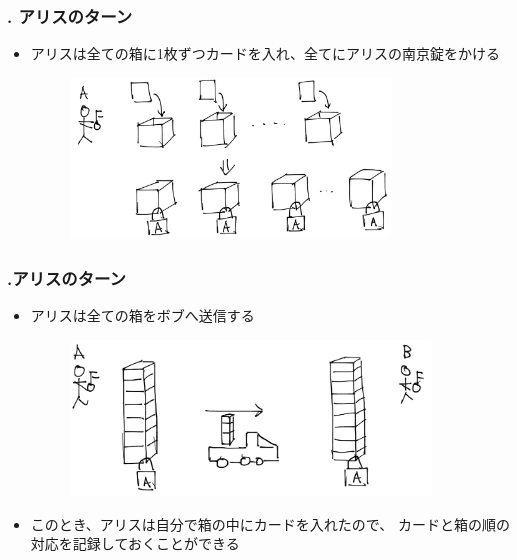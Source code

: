 \setcounter{ProtocolIndex}{1}
\newcommand*{\showIndex}{\theProtocolIndex .\;}
\newcommand*{\showAndIncrement}{%
  \showIndex%
}

\begin{frame}
  \frametitle{\showAndIncrement アリスのターン}

  \begin{itemize}
    \item アリスは全ての箱に1枚ずつカードを入れ、全てにアリスの南京錠をかける
    \begin{figure}[h]
      \includegraphics[width=0.8\textwidth]{img/make_deck.png}
    \end{figure}
  \end{itemize}
\end{frame}

\begin{frame}
  \frametitle{\showIndex アリスのターン}

  \begin{itemize}
    \item<+-> アリスは全ての箱をボブへ送信する
    \begin{figure}[h]
      \includegraphics[width=0.9\textwidth]{img/send_to_b.png}
    \end{figure}

    \item<+-> このとき、アリスは自分で箱の中にカードを入れたので、
    カードと箱の順の対応を記録しておくことができる
  \end{itemize}
\end{frame}


